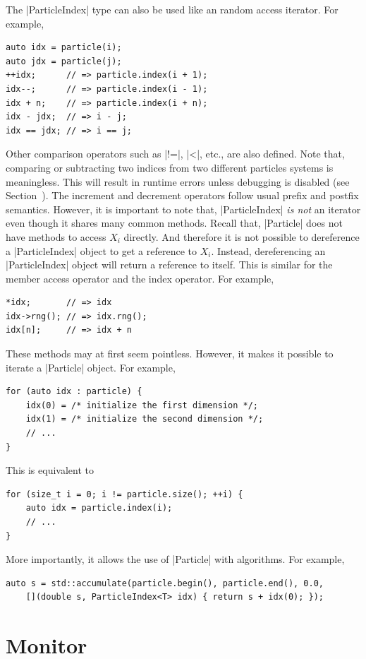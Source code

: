 The |ParticleIndex| type can also be used like an random access iterator. For
example,
\begin{Verbatim}
auto idx = particle(i);
auto jdx = particle(j);
++idx;      // => particle.index(i + 1);
idx--;      // => particle.index(i - 1);
idx + n;    // => particle.index(i + n);
idx - jdx;  // => i - j;
idx == jdx; // => i == j;
\end{Verbatim}
Other comparison operators such as |!=|, |<|, etc., are also defined. Note
that, comparing or subtracting two indices from two different particles systems
is meaningless. This will result in runtime errors unless debugging is disabled
(see Section~). The increment and decrement
operators follow usual prefix and postfix semantics. However, it is important
to note that, |ParticleIndex| \emph{is not} an iterator even though it shares
many common methods. Recall that, |Particle| does not have methods to access
$X_i$ directly. And therefore it is not possible to dereference a
|ParticleIndex| object to get a reference to $X_i$. Instead, dereferencing an
|ParticleIndex| object will return a reference to itself. This is similar for
the member access operator and the index operator. For example,
\begin{Verbatim}
*idx;       // => idx
idx->rng(); // => idx.rng();
idx[n];     // => idx + n
\end{Verbatim}
These methods may at first seem pointless. However, it makes it possible to
iterate a |Particle| object. For example,
\begin{Verbatim}
for (auto idx : particle) {
    idx(0) = /* initialize the first dimension */;
    idx(1) = /* initialize the second dimension */;
    // ...
}
\end{Verbatim}
This is equivalent to
\begin{Verbatim}
for (size_t i = 0; i != particle.size(); ++i) {
    auto idx = particle.index(i);
    // ...
}
\end{Verbatim}
More importantly, it allows the use of |Particle| with algorithms. For example,
\begin{Verbatim}
auto s = std::accumulate(particle.begin(), particle.end(), 0.0,
    [](double s, ParticleIndex<T> idx) { return s + idx(0); });
\end{Verbatim}

\section{Monitor}
\label{sec:Monitor}

